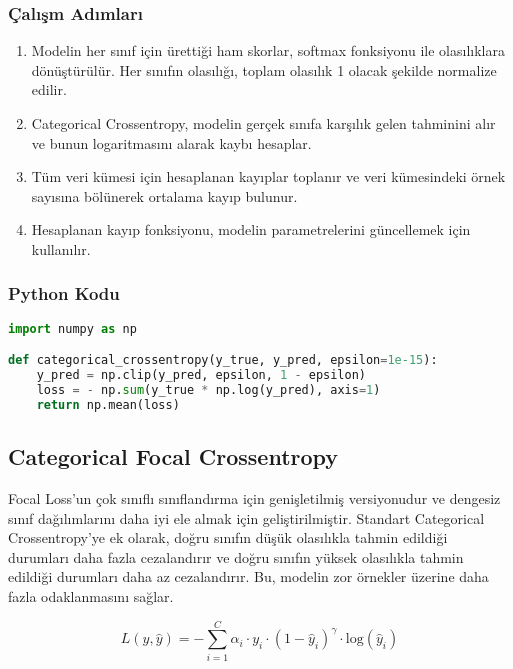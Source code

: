 \subsubsection{Çalışm Adımları}

\begin{enumerate}
    \item Modelin her sınıf için ürettiği ham skorlar, softmax fonksiyonu ile olasılıklara dönüştürülür. Her sınıfın olasılığı, toplam olasılık 1 olacak şekilde normalize edilir.
    \item Categorical Crossentropy, modelin gerçek sınıfa karşılık gelen tahminini alır ve bunun logaritmasını alarak kaybı hesaplar.
    \item Tüm veri kümesi için hesaplanan kayıplar toplanır ve veri kümesindeki örnek sayısına bölünerek ortalama kayıp bulunur.
    \item Hesaplanan kayıp fonksiyonu, modelin parametrelerini güncellemek için kullanılır.
\end{enumerate}

\subsubsection{Python Kodu}

\begin{lstlisting}[language=Python]
import numpy as np

def categorical_crossentropy(y_true, y_pred, epsilon=1e-15):
    y_pred = np.clip(y_pred, epsilon, 1 - epsilon)
    loss = - np.sum(y_true * np.log(y_pred), axis=1)
    return np.mean(loss)
\end{lstlisting}

\newpage

\subsection{Categorical Focal Crossentropy}

Focal Loss'un çok sınıflı sınıflandırma için genişletilmiş versiyonudur ve dengesiz sınıf dağılımlarını daha iyi ele almak için geliştirilmiştir. Standart Categorical Crossentropy'ye ek olarak, doğru sınıfın düşük olasılıkla tahmin edildiği durumları daha fazla cezalandırır ve doğru sınıfın yüksek olasılıkla tahmin edildiği durumları daha az cezalandırır. Bu, modelin zor örnekler üzerine daha fazla odaklanmasını sağlar.

\[ L(y, \hat{y}) = - \sum_{i=1}^{C} \alpha_i \cdot y_i \cdot (1 - \hat{y}_i)^{\gamma} \cdot \text{log}(\hat{y}_i) \]

